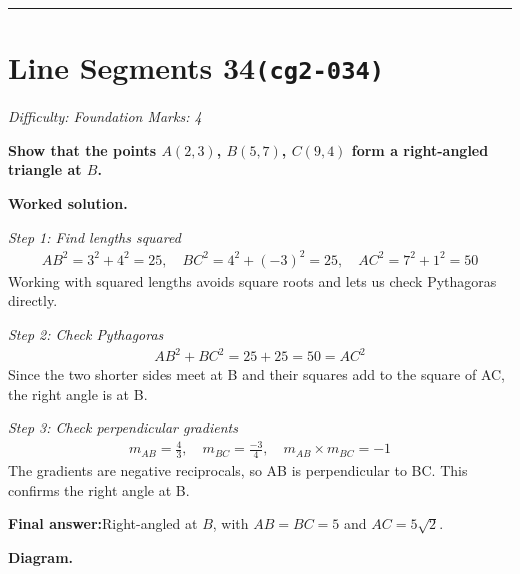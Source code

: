 \documentclass[11pt]{article}
\newcommand{\question}[1]{\par\medskip\noindent\textbf{#1}\par}
\begin{document}
\medskip\hrule

\section*{Line Segments 34\quad\small\texttt{(cg2-034)}}
\textit{Difficulty: Foundation \quad\textbar\quad Marks: 4}

\question{Show that the points \( A(2, 3) \), \( B(5, 7) \), \( C(9, 4) \) form a right-angled triangle at \( B \).}

\textbf{Worked solution.}

\textit{Step 1: Find lengths squared}
\[\begin{gathered}
AB^2 = 3^2+4^2 = 25, \quad BC^2 = 4^2+(-3)^2 = 25, \quad AC^2 = 7^2+1^2 = 50
\end{gathered}\]
Working with squared lengths avoids square roots and lets us check Pythagoras directly.

\textit{Step 2: Check Pythagoras}
\[\begin{gathered}
AB^2 + BC^2 = 25 + 25 = 50 = AC^2
\end{gathered}\]
Since the two shorter sides meet at B and their squares add to the square of AC, the right angle is at B.

\textit{Step 3: Check perpendicular gradients}
\[\begin{gathered}
m_{AB} = \frac{4}{3}, \quad m_{BC} = \frac{-3}{4}, \quad m_{AB} \times m_{BC} = -1
\end{gathered}\]
The gradients are negative reciprocals, so AB is perpendicular to BC. This confirms the right angle at B.

\begin{answerbox}
\textbf{Final answer:}\quad Right-angled at \(\displaystyle B\), with \(\displaystyle AB = BC = 5\) and \(\displaystyle AC = 5\sqrt{2}\).
\end{answerbox}
\textbf{Diagram.}
\end{document}
